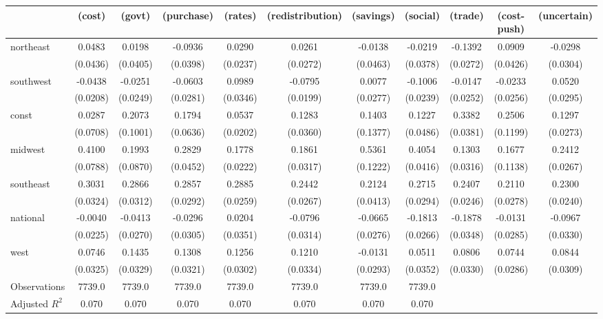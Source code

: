 \begin{tabular}{lcccccccccc}
\toprule
 & (cost) & (govt) & (purchase) & (rates) & (redistribution) & (savings) & (social) & (trade) & (cost-push) & (uncertain) \\
\midrule
northeast & 0.0483 & 0.0198 & -0.0936 & 0.0290 & 0.0261 & -0.0138 & -0.0219 & -0.1392 & 0.0909 & -0.0298 \\
\vspace{0.2cm}
 & (0.0436) & (0.0405) & (0.0398) & (0.0237) & (0.0272) & (0.0463) & (0.0378) & (0.0272) & (0.0426) & (0.0304) \\
southwest & -0.0438 & -0.0251 & -0.0603 & 0.0989 & -0.0795 & 0.0077 & -0.1006 & -0.0147 & -0.0233 & 0.0520 \\
\vspace{0.2cm}
 & (0.0208) & (0.0249) & (0.0281) & (0.0346) & (0.0199) & (0.0277) & (0.0239) & (0.0252) & (0.0256) & (0.0295) \\
const & 0.0287 & 0.2073 & 0.1794 & 0.0537 & 0.1283 & 0.1403 & 0.1227 & 0.3382 & 0.2506 & 0.1297 \\
\vspace{0.2cm}
 & (0.0708) & (0.1001) & (0.0636) & (0.0202) & (0.0360) & (0.1377) & (0.0486) & (0.0381) & (0.1199) & (0.0273) \\
midwest & 0.4100 & 0.1993 & 0.2829 & 0.1778 & 0.1861 & 0.5361 & 0.4054 & 0.1303 & 0.1677 & 0.2412 \\
\vspace{0.2cm}
 & (0.0788) & (0.0870) & (0.0452) & (0.0222) & (0.0317) & (0.1222) & (0.0416) & (0.0316) & (0.1138) & (0.0267) \\
southeast & 0.3031 & 0.2866 & 0.2857 & 0.2885 & 0.2442 & 0.2124 & 0.2715 & 0.2407 & 0.2110 & 0.2300 \\
\vspace{0.2cm}
 & (0.0324) & (0.0312) & (0.0292) & (0.0259) & (0.0267) & (0.0413) & (0.0294) & (0.0246) & (0.0278) & (0.0240) \\
national & -0.0040 & -0.0413 & -0.0296 & 0.0204 & -0.0796 & -0.0665 & -0.1813 & -0.1878 & -0.0131 & -0.0967 \\
\vspace{0.2cm}
 & (0.0225) & (0.0270) & (0.0305) & (0.0351) & (0.0314) & (0.0276) & (0.0266) & (0.0348) & (0.0285) & (0.0330) \\
west & 0.0746 & 0.1435 & 0.1308 & 0.1256 & 0.1210 & -0.0131 & 0.0511 & 0.0806 & 0.0744 & 0.0844 \\
\vspace{0.2cm}
 & (0.0325) & (0.0329) & (0.0321) & (0.0302) & (0.0334) & (0.0293) & (0.0352) & (0.0330) & (0.0286) & (0.0309) \\
\midrule
Observations & 7739.0 & 7739.0 & 7739.0 & 7739.0 & 7739.0 & 7739.0 & 7739.0 \\
Adjusted $R^2$ & 0.070 & 0.070 & 0.070 & 0.070 & 0.070 & 0.070 & 0.070 \\
\bottomrule
\end{tabular}